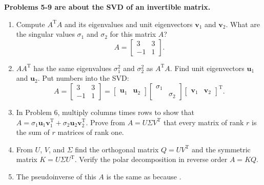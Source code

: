 \documentclass[14pt, a4paper]{article}
\begin{document}
\noindent \textbf{Problems 5-9 are about the SVD of an invertible matrix.}
\begin{enumerate}[resume]
    \item Compute $A^{\mathrm{T}}A$ and its eigenvalues and unit eigenvectors $\boldsymbol{v}_1$ and $\boldsymbol{v}_2$. What are the singular values $\sigma_1$ and $\sigma_2$ for this matrix $A$?
          \[
              A = \begin{bmatrix} 3 & 3 \\ -1 & 1 \end{bmatrix}.
          \]

    \item $AA^{\mathrm{T}}$ has the same eigenvalues $\sigma_1^2$ and $\sigma_2^2$ as $A^{\mathrm{T}}A$. Find unit eigenvectors $\boldsymbol{u}_1$ and $\boldsymbol{u}_2$. Put numbers into the SVD:
          \[
              A = \begin{bmatrix} 3 & 3 \\ -1 & 1 \end{bmatrix} = \begin{bmatrix} \boldsymbol{u}_1 & \boldsymbol{u}_2 \end{bmatrix} \begin{bmatrix} \sigma_1 & \\ & \sigma_2 \end{bmatrix} \begin{bmatrix} \boldsymbol{v}_1 & \boldsymbol{v}_2 \end{bmatrix}^{\mathrm{T}}.
          \]

    \item In Problem 6, multiply columns times rows to show that $A = \sigma_1\boldsymbol{u}_1\boldsymbol{v}_1^{\mathrm{T}} + \sigma_2\boldsymbol{u}_2\boldsymbol{v}_2^{\mathrm{T}}$. Prove from $A = U\Sigma V^{\mathrm{T}}$ that every matrix of rank $r$ is the sum of $r$ matrices of rank one.

    \item From $U$, $V$, and $\Sigma$ find the orthogonal matrix $Q = UV^{\mathrm{T}}$ and the symmetric matrix $K = U\Sigma U^{\mathrm{T}}$. Verify the polar decomposition in reverse order $A = KQ$.

    \item The pseudoinverse of this $A$ is the same as \underline{\hspace{1cm}} because \underline{\hspace{1cm}}.
\end{enumerate}
\end{document}
